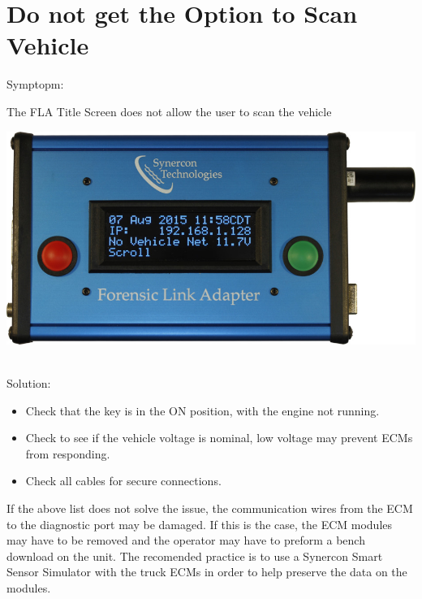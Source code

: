 \documentclass[11pt, oneside]{book}
\begin{document}
\section{Do not get the Option to Scan Vehicle}
Symptopm:\\
\noindent\begin{minipage}{0.45\textwidth}%
The FLA Title Screen does not allow the user to scan the vehicle
\end{minipage}%
\hfill%
\begin{minipage}{0.45\textwidth}
\includegraphics[width=\linewidth]{../media/fla_screens/ethernet_and_others/main/title_no_net}
\end{minipage}\\
Solution:\\
\begin{itemize}
\item Check that the key is in the ON position, with the engine not running.
\item Check to see if the vehicle voltage is nominal, low voltage may prevent ECMs from responding.
\item Check all cables for secure connections.
\end{itemize}
If the above list does not solve the issue, the communication wires from the ECM to the diagnostic port may be damaged. If this is the case, the ECM modules may have to be removed and the operator may have to preform a bench download on the unit. The recomended practice is to use a Synercon Smart Sensor Simulator with the truck ECMs in order to help preserve the data on the modules.
\end{document}
